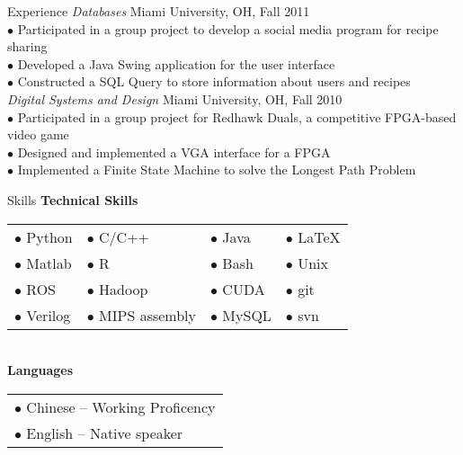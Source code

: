 \documentclass{resume} %
\begin{document}
\begin{rSection}{Experience}
  \textit{Databases} \hfill Miami University, OH, Fall 2011\\
  $\bullet$ Participated in a group project to develop a social media program for recipe sharing \\
  $\bullet$ Developed a Java Swing application for the user interface \\
  $\bullet$ Constructed a SQL Query to store information about users and recipes\\[1 mm]
  \textit{Digital Systems and Design} \hfill Miami University, OH, Fall 2010\\
  $\bullet$ Participated in a group project for Redhawk Duals, a competitive FPGA-based video game\\
  $\bullet$ Designed and implemented a VGA interface for a FPGA\\
  $\bullet$ Implemented a Finite State Machine to solve the Longest Path Problem\\ \newpage
\end{rSection}
\begin{rSection}{Skills}
  \textbf{Technical Skills}\\[1 mm]
  \begin{tabular}{llll}
     $\bullet$ Python   &  $\bullet$ C/C++         &  $\bullet$ Java   &   $\bullet$ \LaTeX\\
     $\bullet$ Matlab   &  $\bullet$ R             &  $\bullet$ Bash   &   $\bullet$ Unix \\ 
     $\bullet$ ROS      &  $\bullet$ Hadoop        &  $\bullet$ CUDA   &   $\bullet$ git\\
     $\bullet$ Verilog  &  $\bullet$ MIPS assembly &  $\bullet$ MySQL  &   $\bullet$ svn\\
  \end{tabular}\\[1 mm]
  \textbf{Languages}\\[1 mm]
  \begin{tabular}{l}
    $\bullet$ Chinese --  Working Proficency\\
    $\bullet$ English --  Native speaker
  \end{tabular}
\end{rSection}
\end{document}
